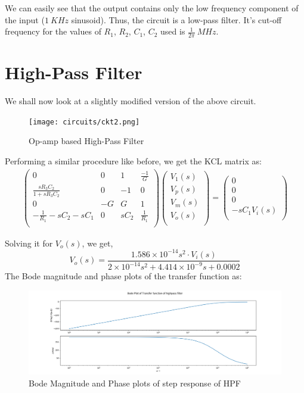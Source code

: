 \documentclass[11pt, a4paper, twoside]{article}
\begin{document}
    We can easily see that the output contains only the low frequency component of the input ($1\ KHz$ sinusoid). Thus, the circuit is a low-pass filter. It's cut-off frequency for the values of $R_1$, $R_2$, $C_1$, $C_2$ used is $\frac{1}{2\pi}\ MHz$.
    
\section{High-Pass Filter}

We shall now look at a slightly modified version of the above circuit.
\begin{figure}[H]
    \centering
    \texttt{[image: circuits/ckt2.png]}
    \caption{Op-amp based High-Pass Filter}
    \label{fig:fig5}
\end{figure}

Performing a similar procedure like before, we get the KCL matrix as:
\begin{gather}
    \begin{pmatrix}
            0&0&1&\frac{-1}{G}\\
            \frac{sR_3C_2}{1+sR_3C_2}&0&-1&0\\
            0&-G&G&1\\
            -\frac{1}{R_1}-sC_2-sC_1&0&sC_2&\frac{1}{R_1}\\
        \end{pmatrix}
        \begin{pmatrix}
            V_1(s)\\
            V_p(s)\\
            V_m(s)\\
            V_o(s)\\
        \end{pmatrix}
        =
        \begin{pmatrix}
            0\\
            0\\
            0\\
            -sC_1V_i(s)\\
        \end{pmatrix}
\end{gather}

Solving it for $V_o(s)$, we get, 
\begin{equation}
    V_o(s) = \frac{1.586\times10^{-14}s^2\cdot V_i(s)}{2\times10^{-14}s^2 + 4.414\times10^{-9}s + 0.0002}
\end{equation}
The Bode magnitude and phase plots of the transfer function as:
\begin{figure}[H]
    \centering
    \includegraphics[scale=0.4]{plots/Fig 5.png}
    \caption{Bode Magnitude and Phase plots of step response of HPF}
    \label{fig:Fig6}
\end{figure}
\end{document}
